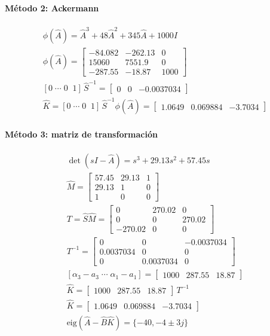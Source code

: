 \documentclass[11pt]{article}
\begin{document}
\paragraph{Método 2: Ackermann}
\begin{gather*}
\phi(\hat{A})=\hat{A}^{3} + 48\hat{A}^{2} + 345\hat{A} + 1000I\\
\phi(\hat{A})=\begin{bmatrix}-84.082 & -262.13 & 0 \\ 15060 & 7551.9 & 0 \\ -287.55 & -18.87 & 1000\end{bmatrix}\\
[0\;\cdots\;0\;\;1]\,\hat{S}^{-1}=\begin{bmatrix}0 & 0 & -0.0037034\end{bmatrix}\\
\hat{K}=[0\;\cdots\;0\;\;1]\,\hat{S}^{-1}\phi(\hat{A})=\begin{bmatrix}1.0649 & 0.069884 & -3.7034\end{bmatrix}
\end{gather*}
\paragraph{Método 3: matriz de transformación}
\begin{gather*}
\det(sI-\hat{A})=s^{3} + 29.13s^{2} + 57.45s\\
\hat{M}=\begin{bmatrix}57.45 & 29.13 & 1 \\ 29.13 & 1 & 0 \\ 1 & 0 & 0\end{bmatrix}\\
T=\hat{S}\hat{M}=\begin{bmatrix}0 & 270.02 & 0 \\ 0 & 0 & 270.02 \\ -270.02 & 0 & 0\end{bmatrix}\\
T^{-1}=\begin{bmatrix}0 & 0 & -0.0037034 \\ 0.0037034 & 0 & 0 \\ 0 & 0.0037034 & 0\end{bmatrix}\\
[\alpha_3-a_3\;\cdots\;\alpha_1-a_1]=\begin{bmatrix}1000 & 287.55 & 18.87\end{bmatrix}\\
\hat{K}=\begin{bmatrix}1000 & 287.55 & 18.87\end{bmatrix}\,T^{-1}\\
\hat{K}=\begin{bmatrix}1.0649 & 0.069884 & -3.7034\end{bmatrix}\\
\text{eig}(\hat{A}-\hat{B}\hat{K})=\{-40, -4\pm3j\}
\end{gather*}
\end{document}
